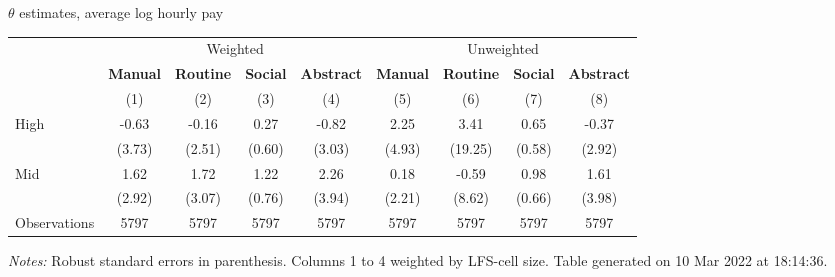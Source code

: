 \begin{center}
\begin{threeparttable}[!h]
\caption{$ \theta $ estimates, average log hourly pay}
\begin{tabular}{lcccccccc}
\toprule
\toprule
& \multicolumn{4}{c}{Weighted} & \multicolumn{4}{c}{Unweighted} \\
&\multicolumn{1}{c}{\textbf{Manual}}&\multicolumn{1}{c}{\textbf{Routine}}&\multicolumn{1}{c}{\textbf{Social}}&\multicolumn{1}{c}{\textbf{Abstract}}&\multicolumn{1}{c}{\textbf{Manual}}&\multicolumn{1}{c}{\textbf{Routine}}&\multicolumn{1}{c}{\textbf{Social}}&\multicolumn{1}{c}{\textbf{Abstract}} \\
\textbf{}&\multicolumn{1}{c}{(1)}&\multicolumn{1}{c}{(2)}&\multicolumn{1}{c}{(3)}&\multicolumn{1}{c}{(4)}&\multicolumn{1}{c}{(5)}&\multicolumn{1}{c}{(6)}&\multicolumn{1}{c}{(7)}&\multicolumn{1}{c}{(8)} \\
\midrule
High                &       -0.63&       -0.16&        0.27&       -0.82&        2.25&        3.41&        0.65&       -0.37\\
                    &      (3.73)&      (2.51)&      (0.60)&      (3.03)&      (4.93)&     (19.25)&      (0.58)&      (2.92)\\
Mid                 &        1.62&        1.72&        1.22&        2.26&        0.18&       -0.59&        0.98&        1.61\\
                    &      (2.92)&      (3.07)&      (0.76)&      (3.94)&      (2.21)&      (8.62)&      (0.66)&      (3.98)\\
Observations        &        5797&        5797&        5797&        5797&        5797&        5797&        5797&        5797\\
\bottomrule
\bottomrule
\end{tabular}
\begin{tablenotes}
\item \footnotesize \textit{Notes:} Robust standard errors in parenthesis. Columns 1 to 4 weighted by LFS-cell size. Table generated on 10 Mar 2022 at 18:14:36.
\end{tablenotes}
\end{threeparttable}
\end{center}
